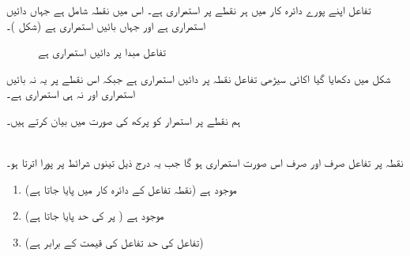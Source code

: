 تفاعل  اپنے پورے دائرہ کار  میں ہر نقطے پر استمراری ہے۔ اس میں نقطہ  شامل ہے جہاں  دائیں استمراری ہے اور  جہاں  بائیں استمراری ہے (شکل )۔ 
\begin{figure}
\centering
\begin{minipage}{0.45\textwidth}
\centering
{}
\caption{پورے دائرہ کار کے پر نقطہ پر استمراری}
\label{شکل_حد_استمراری_تفاعل}
\end{minipage}\hfill
\begin{minipage}{0.45\textwidth}
\centering
{}
\caption{تفاعل مبدا پر دائیں استمراری ہے}
\label{شکل_حد_دائیں _استمراری_تفاعل}
\end{minipage}%
\end{figure}

شکل  میں دکھایا گیا اکائی سیڑھی تفاعل   نقطہ  پر دائیں استمراری ہے جبکہ اس نقطے پر یہ نہ بائیں استمراری  اور نہ ہی استمراری ہے۔ 

ہم نقطے پر استمرار کو   پرکھ کی صورت میں بیان کرتے ہیں۔

\\
نقطہ  پر تفاعل  صرف اور صرف اس صورت استمراری ہو گا جب یہ درج ذیل تینوں شرائط پر پورا اترتا ہو۔
\begin{enumerate}[1.]
\item
{} موجود ہے \quad \quad (نقطہ  تفاعل  کے دائرہ کار میں  پایا جاتا ہے)
\item
{} موجود ہے \quad \quad  ( پر  کی حد پایا جاتا ہے)
\item
{} 
\quad \quad 
 (تفاعل کی حد تفاعل کی قیمت کے برابر ہے)
\end{enumerate}

